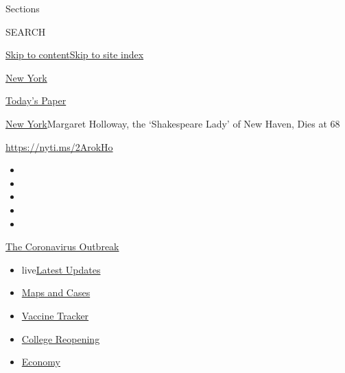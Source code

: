Sections

SEARCH

\protect\hyperlink{site-content}{Skip to
content}\protect\hyperlink{site-index}{Skip to site index}

\href{https://www.nytimes3xbfgragh.onion/section/nyregion}{New York}

\href{https://myaccount.nytimes3xbfgragh.onion/auth/login?response_type=cookie\&client_id=vi}{}

\href{https://www.nytimes3xbfgragh.onion/section/todayspaper}{Today's
Paper}

\href{/section/nyregion}{New York}\textbar{}Margaret Holloway, the
`Shakespeare Lady' of New Haven, Dies at 68

\url{https://nyti.ms/2ArokHo}

\begin{itemize}
\item
\item
\item
\item
\item
\end{itemize}

\href{https://www.nytimes3xbfgragh.onion/news-event/coronavirus?action=click\&pgtype=Article\&state=default\&region=TOP_BANNER\&context=storylines_menu}{The
Coronavirus Outbreak}

\begin{itemize}
\tightlist
\item
  live\href{https://www.nytimes3xbfgragh.onion/2020/08/04/world/coronavirus-covid-19.html?action=click\&pgtype=Article\&state=default\&region=TOP_BANNER\&context=storylines_menu}{Latest
  Updates}
\item
  \href{https://www.nytimes3xbfgragh.onion/interactive/2020/us/coronavirus-us-cases.html?action=click\&pgtype=Article\&state=default\&region=TOP_BANNER\&context=storylines_menu}{Maps
  and Cases}
\item
  \href{https://www.nytimes3xbfgragh.onion/interactive/2020/science/coronavirus-vaccine-tracker.html?action=click\&pgtype=Article\&state=default\&region=TOP_BANNER\&context=storylines_menu}{Vaccine
  Tracker}
\item
  \href{https://www.nytimes3xbfgragh.onion/2020/08/02/us/covid-college-reopening.html?action=click\&pgtype=Article\&state=default\&region=TOP_BANNER\&context=storylines_menu}{College
  Reopening}
\item
  \href{https://www.nytimes3xbfgragh.onion/live/2020/08/03/business/stock-market-today-coronavirus?action=click\&pgtype=Article\&state=default\&region=TOP_BANNER\&context=storylines_menu}{Economy}
\end{itemize}

